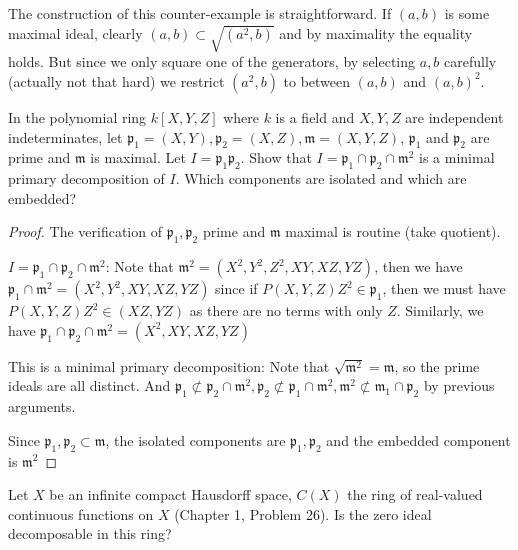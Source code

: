\documentclass{solution}
\begin{document}
{\color{red} The construction of this counter-example is straightforward. If $(a, b)$ is some maximal ideal, clearly $(a, b) \subset \sqrt{(a^2, b)}$ and by maximality the equality holds. But since we only square one of the generators, by selecting $a, b$ carefully (actually not that hard) we restrict $(a^2, b)$ to between $(a, b)$ and $(a, b)^2$.}

\begin{problem}
    In the polynomial ring $k[X, Y, Z]$ where $k$ is a field and $X, Y, Z$ are independent indeterminates, let $\mathfrak{p}_1 = (X, Y), \mathfrak{p}_2 = (X, Z), \mathfrak{m} = (X, Y, Z)$, $\mathfrak{p}_1$ and $\mathfrak{p}_2$ are prime and $\mathfrak{m}$ is maximal. Let $I = \mathfrak{p}_1 \mathfrak{p}_2$. Show that $I = \mathfrak{p}_1 \cap \mathfrak{p}_2 \cap \mathfrak{m}^2$ is a minimal primary decomposition of $I$. Which components are isolated and which are embedded?
\end{problem}

\begin{proof}
    The verification of $\mathfrak{p}_1, \mathfrak{p}_2$ prime and $\mathfrak{m}$ maximal is routine (take quotient). 

    $I = \mathfrak{p}_1 \cap \mathfrak{p}_2 \cap \mathfrak{m}^2$: Note that $\mathfrak{m}^2 = (X^2, Y^2, Z^2, XY, XZ, YZ)$, then we have $\mathfrak{p}_1 \cap \mathfrak{m}^2 = (X^2, Y^2, XY, XZ, YZ)$ since if $P(X, Y, Z)Z^2 \in \mathfrak{p}_1$, then we must have $P(X, Y, Z)Z^2 \in (XZ, YZ)$ as there are no terms with only $Z$. Similarly, we have $\mathfrak{p}_1 \cap \mathfrak{p}_2 \cap \mathfrak{m}^2 = (X^2, XY, XZ, YZ)$

    This is a minimal primary decomposition: Note that $\sqrt{\mathfrak{m}^2} = \mathfrak{m}$, so the prime ideals are all distinct. And $\mathfrak{p}_1 \not \subset \mathfrak{p}_2 \cap \mathfrak{m}^2, \mathfrak{p}_2 \not\subset \mathfrak{p}_1 \cap \mathfrak{m}^2, \mathfrak{m}^2 \not \subset \mathfrak{m}_1 \cap \mathfrak{p}_2$ by previous arguments.

    Since $\mathfrak{p}_1, \mathfrak{p}_2 \subset \mathfrak{m}$, the isolated components are $\mathfrak{p}_1, \mathfrak{p}_2$ and the embedded component is $\mathfrak{m}^2$
\end{proof}

\begin{problem}
    Let $X$ be an infinite compact Hausdorff space, $C(X)$ the ring of real-valued continuous functions on $X$ (Chapter 1, Problem 26). Is the zero ideal decomposable in this ring?
\end{problem}
\end{document}
